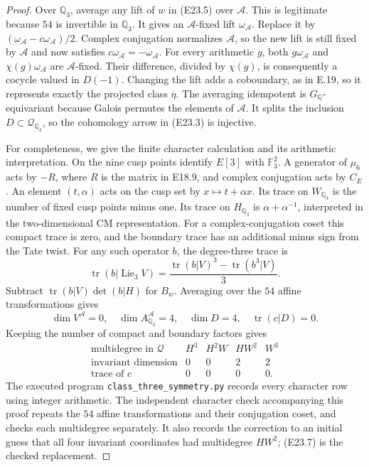 \begin{proof}
Over $\mathbb Q_3$, average any lift of $w$ in (E23.5)
over $\mathcal A$. This is legitimate because $54$ is
invertible in $\mathbb Q_3$. It gives an
$\mathcal A$-fixed lift $\omega_{\mathcal A}$.
Replace it by
$(\omega_{\mathcal A}-c\omega_{\mathcal A})/2$.
Complex conjugation normalizes $\mathcal A$, so the
new lift is still fixed by $\mathcal A$ and now satisfies
$c\omega_{\mathcal A}=-\omega_{\mathcal A}$.
For every arithmetic $g$, both $g\omega_{\mathcal A}$
and $\chi(g)\omega_{\mathcal A}$ are
$\mathcal A$-fixed. Their difference, divided by $\chi(g)$,
is consequently a cocycle valued in $D(-1)$.
Changing the lift adds a coboundary, as in E.19, so it
represents exactly the projected class $\overline\eta$.
The averaging idempotent is $G_{\mathbb Q}$-equivariant
because Galois permutes the elements of $\mathcal A$.
It splits the inclusion $D\subset\mathcal Q_{\mathbb Q_3}$,
so the cohomology arrow in (E23.3) is injective.

For completeness, we give the finite character calculation
and its arithmetic interpretation. On the nine cusp points
identify $E[3]$ with $\mathbb F_3^2$. A generator of
$\mu_6$ acts by $-R$, where $R$ is the matrix in E18.9,
and complex conjugation acts by $C_E$. An element
$(t,\alpha)$ acts on the cusp set by $x\mapsto t+\alpha x$.
Its trace on $W_{\mathbb Q_3}$ is the number of fixed
cusp points minus one. Its trace on $H_{\mathbb Q_3}$
is $\alpha+\alpha^{-1}$, interpreted in the two-dimensional
CM representation. For a complex-conjugation coset this
compact trace is zero, and the boundary trace has an
additional minus sign from the Tate twist.
For any such operator $b$, the degree-three trace is
\[
 \operatorname{tr}(b|\operatorname{Lie}_3V)
 =\frac{\operatorname{tr}(b|V)^3-
                    \operatorname{tr}(b^3|V)}{3}.
 \tag{E23.6}
\]
Subtract $\operatorname{tr}(b|V)\det(b|H)$ for $B_w$.
Averaging over the $54$ affine transformations gives
\[
 \dim V^{\mathcal A}=0,\quad
 \dim A_{\mathbb Q_3}^{\mathcal A}=4,\quad
 \dim D=4,\quad \operatorname{tr}(c|D)=0.
\]
Keeping the number of compact and boundary factors gives
\[
\begin{array}{c|rrrr}
 \text{multidegree in }\mathcal Q&H^3&H^2W&HW^2&W^3\\\hline
 \text{invariant dimension}&0&0&2&2\\
 \text{trace of }c&0&0&0&0 .
\end{array}
 \tag{E23.7}
\]
The executed program \texttt{class\_three\_symmetry.py}
records every character row using integer arithmetic.
The independent character check accompanying this proof
repeats the $54$ affine transformations and their conjugation
coset, and checks each multidegree separately. It also records
the correction to an initial guess that all four invariant
coordinates had multidegree $HW^2$; (E23.7) is the checked
replacement.


\end{proof}
